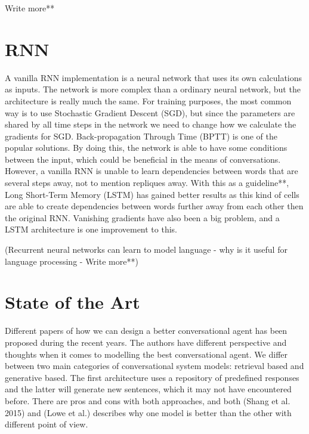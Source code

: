 \documentclass{article} %
\begin{document}
Write more**

\section{RNN}
A vanilla RNN implementation is a neural network that uses its own calculations as inputs. The network is more complex than a ordinary neural network, but the architecture is really much the same. For training purposes, the most common way is to use Stochastic Gradient Descent (SGD), but since the parameters are shared by all time steps in the network we need to change how we calculate the gradients for SGD. Back-propagation Through Time (BPTT) is one of the popular solutions. By doing this, the network is able to have some conditions between the input, which could be beneficial in the means of conversations. However, a vanilla RNN is unable to learn dependencies between words that are several steps away, not to mention repliques away. With this as a guideline**, Long Short-Term Memory (LSTM) has gained better results as this kind of cells are able to create dependencies between words further away from each other then the original RNN. Vanishing gradients have also been a big problem, and a LSTM architecture is one improvement to this.

(Recurrent neural networks can learn to model language - why is it useful for language processing - Write more**)

\section{State of the Art}
Different papers of how we can design a better conversational agent has been proposed during the recent years. The authors have different perspective and thoughts when it comes to modelling the best conversational agent. We differ between two main categories of conversational system models: retrieval based and generative based. The first architecture uses a repository of predefined responses and the latter will generate new sentences, which it may not have encountered before. There are pros and cons with both approaches, and both (Shang et al. 2015) and (Lowe et al.) describes why one model is better than the other with different point of view. 
\end{document}
